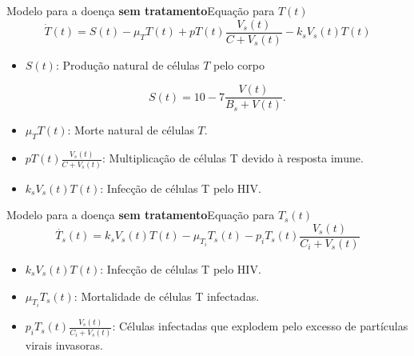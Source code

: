 \documentclass[13pt]{beamer}
\begin{document}
\begin{frame}{Modelo para a doença \textbf{sem tratamento}}{Equação para \( T ( t ) \)}
    \begin{equation*}
        \dot{ T } ( t ) = S ( t ) - \mu_{ T } T ( t ) + p T ( t ) \frac{ V_{ s } ( t ) }{ C + V_{ s } ( t ) } - k_{ s } V_{ s } ( t ) T ( t ) \label{Tponto_S}
    \end{equation*}
    \begin{itemize}
        \item<2-> \( S ( t ) \): Produção natural de células \( T \) pelo corpo

            \begin{equation*}
                S ( t ) = 10 - 7 \frac{ V ( t ) }{ B_{ s } + V ( t ) }
            .\end{equation*}

        \item<3-> \( \mu_{ T } T ( t ) \): Morte natural de células \( T \).
        \item<4-> \( p T ( t ) \frac{ V_{ s } ( t ) }{ C + V_{ s } ( t ) } \): Multiplicação de células T devido à resposta imune.
        \item<5-> \( k_{ s } V_{ s } ( t ) T ( t ) \): Infecção de células T pelo HIV.
    \end{itemize}
\end{frame}

\begin{frame}{Modelo para a doença \textbf{sem tratamento}}{Equação para \( T_{ s } ( t ) \)}
    \begin{equation*}
        \dot{T_{ s }} ( t ) = k_{ s } V_{ s } ( t ) T ( t ) - \mu_{ T_{ i } } T_{ s } ( t ) - p_{ i } T_{ s } ( t ) \frac{ V_{ s } ( t ) }{ C_{ i } + V_{ s } ( t ) } \label{Tsponto_S}
    \end{equation*}
    \begin{itemize}
        \item<2-> \( k_{ s } V_{ s } ( t ) T ( t ) \): Infecção de células T pelo HIV.
        \item<3-> \( \mu_{ T_{ i } } T_{ s } ( t ) \): Mortalidade de células T infectadas.
        \item<4-> \( p_{ i } T_{ s } ( t ) \frac{ V_{ s } ( t ) }{ C_{ i } + V_{ s } ( t ) } \): Células infectadas que explodem pelo excesso de partículas virais invasoras.
    \end{itemize}
\end{frame}
\end{document}
